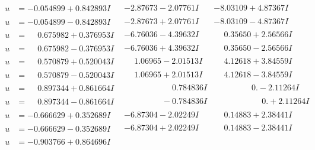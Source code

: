 \documentclass[1p]{elsarticle_modified}
\theoremstyle{definition}
\begin{document}
$$\begin{array}{c|c|c}
\begin{aligned}
u &= -0.054899 + 0.842893 I\end{aligned}
 & -2.87673 - 2.07761 I & -8.03109 + 4.87367 I \\ \hline\begin{aligned}
u &= -0.054899 - 0.842893 I\end{aligned}
 & -2.87673 + 2.07761 I & -8.03109 - 4.87367 I \\ \hline\begin{aligned}
u &= \phantom{-}0.675982 + 0.376953 I\end{aligned}
 & -6.76036 - 4.39632 I & \phantom{-}0.35650 + 2.56566 I \\ \hline\begin{aligned}
u &= \phantom{-}0.675982 - 0.376953 I\end{aligned}
 & -6.76036 + 4.39632 I & \phantom{-}0.35650 - 2.56566 I \\ \hline\begin{aligned}
u &= \phantom{-}0.570879 + 0.520043 I\end{aligned}
 & \phantom{-}1.06965 - 2.01513 I & \phantom{-}4.12618 + 3.84559 I \\ \hline\begin{aligned}
u &= \phantom{-}0.570879 - 0.520043 I\end{aligned}
 & \phantom{-}1.06965 + 2.01513 I & \phantom{-}4.12618 - 3.84559 I \\ \hline\begin{aligned}
u &= \phantom{-}0.897344 + 0.861664 I\end{aligned}
 & \phantom{-0.000000 -}0.784836 I & \phantom{-0.000000 } 0. - 2.11264 I \\ \hline\begin{aligned}
u &= \phantom{-}0.897344 - 0.861664 I\end{aligned}
 & \phantom{-0.000000 } -0.784836 I & \phantom{-0.000000 -}0. + 2.11264 I \\ \hline\begin{aligned}
u &= -0.666629 + 0.352689 I\end{aligned}
 & -6.87304 - 2.02249 I & \phantom{-}0.14883 + 2.38441 I \\ \hline\begin{aligned}
u &= -0.666629 - 0.352689 I\end{aligned}
 & -6.87304 + 2.02249 I & \phantom{-}0.14883 - 2.38441 I \\ \hline\begin{aligned}
u &= -0.903766 + 0.864696 I\end{aligned}

\end{array}$$
\end{document}
